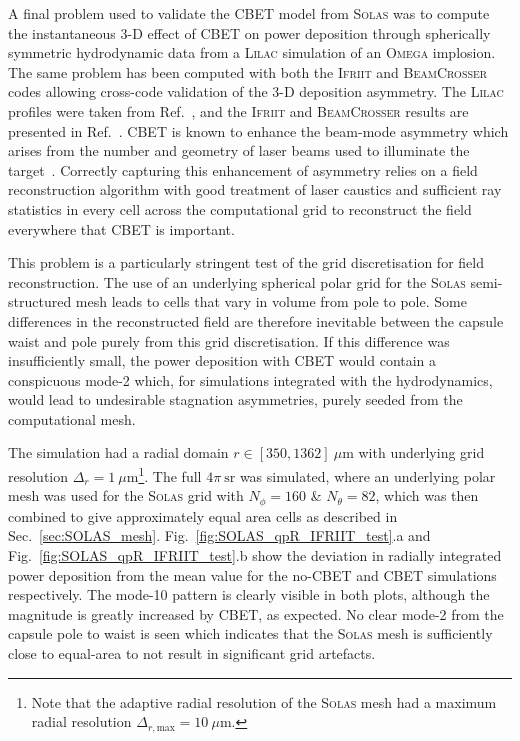 A final problem used to validate the \ac{CBET} model from \textsc{Solas} was to compute the instantaneous 3-D effect of \ac{CBET} on power deposition through spherically symmetric hydrodynamic data from a \textsc{Lilac} simulation of an \textsc{Omega} implosion.
The same problem has been computed with both the \textsc{Ifriit} and \textsc{BeamCrosser} codes allowing cross-code validation of the 3-D deposition asymmetry.
The \textsc{Lilac} profiles were taken from Ref.~\cite{colaitis_inverse_2021}, and the \textsc{Ifriit} and \textsc{BeamCrosser} results are presented in Ref.~\cite{colaitis_3d_2023}.
\ac{CBET} is known to enhance the beam-mode asymmetry which arises from the number and geometry of laser beams used to illuminate the target~\cite{edgell_mitigation_2017}.
Correctly capturing this enhancement of asymmetry relies on a field reconstruction algorithm with good treatment of laser caustics and sufficient ray statistics in every cell across the computational grid to reconstruct the field everywhere that \ac{CBET} is important.

This problem is a particularly stringent test of the grid discretisation for field reconstruction.
The use of an underlying spherical polar grid for the \textsc{Solas} semi-structured mesh leads to cells that vary in volume from pole to pole.
Some differences in the reconstructed field are therefore inevitable between the capsule waist and pole purely from this grid discretisation.
If this difference was insufficiently small, the power deposition with \ac{CBET} would contain a conspicuous mode-2 which, for simulations integrated with the hydrodynamics, would lead to undesirable stagnation asymmetries, purely seeded from the computational mesh.

The simulation had a radial domain $r\in[350,1362]\ \mu\text{m}$ with underlying grid resolution $\Delta_r=1\ \mu\text{m}$\footnote{Note that the adaptive radial resolution of the \textsc{Solas} mesh had a maximum radial resolution $\Delta_{r,\text{max}}=10\ \mu\text{m}$.}.
The full $4\pi\ \text{sr}$ was simulated, where an underlying polar mesh was used for the \textsc{Solas} grid with $N_{\phi}=160$ \& $N_{\theta}=82$, which was then combined to give approximately equal area cells as described in Sec.~\ref{sec:SOLAS_mesh}.
Fig.~\ref{fig:SOLAS_qpR_IFRIIT_test}.a and Fig.~\ref{fig:SOLAS_qpR_IFRIIT_test}.b show the deviation in radially integrated power deposition from the mean value for the no-\ac{CBET} and \ac{CBET} simulations respectively.
The mode-10 pattern is clearly visible in both plots, although the magnitude is greatly increased by \ac{CBET}, as expected.
No clear mode-2 from the capsule pole to waist is seen which indicates that the \textsc{Solas} mesh is sufficiently close to equal-area to not result in significant grid artefacts.

